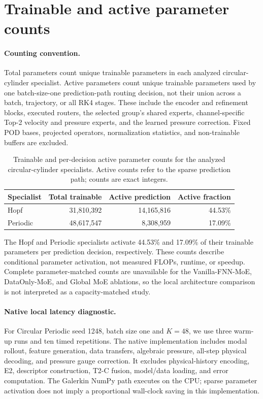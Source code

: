 \section{Trainable and active parameter counts}
\label{app:parameter_counts}

\paragraph{Counting convention.}
Total parameters count unique trainable parameters in each analyzed
circular-cylinder specialist. Active parameters count unique trainable
parameters used by one batch-size-one prediction-path routing decision,
not their union across a batch, trajectory, or all RK4 stages. These include
the encoder and refinement blocks, executed routers, the selected group's
shared experts, channel-specific Top-2 velocity and pressure experts, and
the learned pressure correction. Fixed POD bases, projected operators,
normalization statistics, and non-trainable buffers are excluded.

\par
\begin{table}[H]
\centering
\caption{Trainable and per-decision active parameter counts for the analyzed
circular-cylinder specialists. Active counts refer to the sparse prediction
path; counts are exact integers.}
\label{tab:parameter_counts}
\begin{tabular}{lrrr}
\toprule
Specialist & Total trainable & Active prediction & Active fraction \\
\midrule
Hopf & 31,810,392 & 14,165,816 & 44.53\% \\
Periodic & 48,617,547 & 8,308,959 & 17.09\% \\
\bottomrule
\end{tabular}
\end{table}
\par

The Hopf and Periodic specialists activate 44.53\% and 17.09\% of their
trainable parameters per prediction decision, respectively. These counts
describe conditional parameter activation, not measured FLOPs, runtime,
or speedup. Complete parameter-matched counts are unavailable for the
Vanilla-FNN-MoE, DataOnly-MoE, and Global MoE ablations, so the local
architecture comparison is not interpreted as a capacity-matched study.

\paragraph{Native local latency diagnostic.}
For Circular Periodic seed 1248, batch size one and $K=48$, we use three
warm-up runs and ten timed repetitions. The native implementation
includes modal rollout, feature generation, data transfers, algebraic
pressure, all-step physical decoding, and pressure gauge correction.
It excludes physical-history encoding, E2, descriptor construction,
T2-C fusion, model/data loading, and error computation. The Galerkin
NumPy path executes on the CPU; sparse parameter activation does not
imply a proportional wall-clock saving in this implementation.


